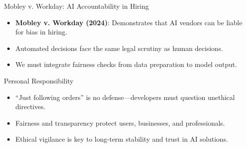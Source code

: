 \documentclass[aspectratio=169]{beamer}
\begin{document}
\begin{frame}{Mobley v. Workday: AI Accountability in Hiring}
\begin{itemize}
\item \textbf{Mobley v. Workday (2024)}: Demonstrates that AI vendors can be liable for bias in hiring.
\item Automated decisions face the same legal scrutiny as human decisions.
\item We must integrate fairness checks from data preparation to model output.
\end{itemize}
\end{frame}

\begin{frame}{Personal Responsibility}
\begin{itemize}
\item “Just following orders” is no defense—developers must question unethical directives.
\item Fairness and transparency protect users, businesses, and professionals.
\item Ethical vigilance is key to long-term stability and trust in AI solutions.
\end{itemize}
\end{frame}
\end{document}
